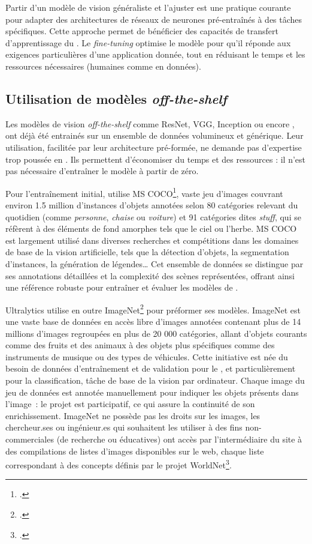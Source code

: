 Partir d'un modèle de vision généraliste et l'ajuster est une
pratique courante pour adapter des architectures de réseaux de neurones
pré-entraînés à des tâches spécifiques. Cette approche permet de
bénéficier des capacités de transfert d'apprentissage du
\ml. Le \textit{fine-tuning} optimise le modèle pour qu'il réponde
aux exigences particulières d'une application donnée, tout en réduisant
le temps et les ressources nécessaires (humaines comme en données).

\hypertarget{modeles-off-the-shelf}{%
\subsection{Utilisation de modèles
\emph{off-the-shelf}}\label{modeles-off-the-shelf}}

Les modèles de vision \textit{off-the-shelf} comme ResNet, VGG, Inception ou
encore \yolov, ont déjà été entrainés sur un ensemble de données
volumineux et générique. Leur utilisation, facilitée par leur
architecture pré-formée, ne demande pas d'expertise trop poussée en
\ml. Ils permettent d'économiser du temps et des ressources
: il n'est pas nécessaire d'entraîner le modèle à partir de zéro.

Pour l'entraînement initial, \yolov utilise MS COCO\footcite{noauthor_coco_nodate}, vaste jeu
d'images couvrant environ 1.5 million d'instances d'objets annotées
selon 80 catégories relevant du quotidien (comme \emph{personne},
\emph{chaise} ou \emph{voiture}) et 91 catégories dites \textit{stuff}, qui
se réfèrent à des éléments de fond amorphes tels que le ciel ou l'herbe.
MS COCO est largement utilisé dans diverses recherches et compétitions
dans les domaines de base de la vision artificielle, tels que la détection
d'objets, la segmentation d'instances, la génération de légendes\ldots{}
Cet ensemble de données se distingue par ses annotations détaillées et
la complexité des scènes représentées, offrant ainsi une référence
robuste pour entraîner et évaluer les modèles de \dl.

Ultralytics utilise en outre ImageNet\footcite{noauthor_imagenet_nodate} pour
préformer ses modèles. ImageNet est une vaste base de données en accès
libre d'images annotées contenant plus de 14 millions d'images
regroupées en plus de 20 000 catégories, allant d'objets courants comme
des fruits et des animaux à des objets plus spécifiques comme des
instruments de musique ou des types de véhicules. Cette initiative est
née du besoin de données d'entraînement et de validation pour le \ml, et particulièrement pour la classification, tâche de base de
la vision par ordinateur. Chaque image du jeu de données est annotée
manuellement pour indiquer les objets présents dans l'image~: le projet
est participatif, ce qui assure la continuité de son enrichissement.
ImageNet ne possède pas les droits sur les images, les chercheur.ses ou
ingénieur.es qui souhaitent les utiliser à des fins
non-commerciales (de recherche ou éducatives) ont accès par
l'intermédiaire du site à des compilations de listes d'images
disponibles sur le web, chaque liste correspondant à des concepts
définis par le projet WorldNet\footcite{noauthor_wordnet_nodate}.

